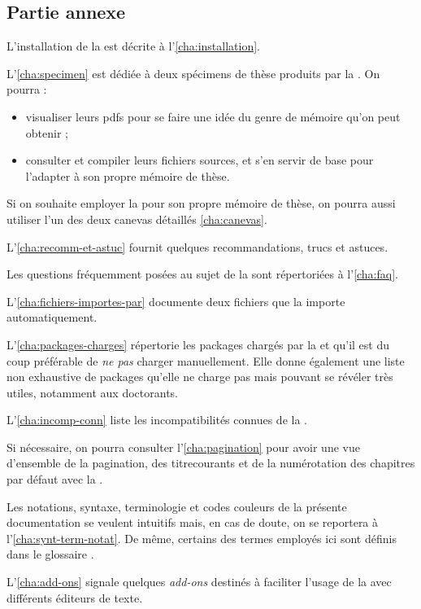 \subsection{Partie annexe}
\label{sec:partie-annexe}

L'installation de la \yatcl{} est décrite à l'\vref{cha:installation}.

L'\vref{cha:specimen} est dédiée à deux spécimens de thèse produits par la
\yatcl{}. On pourra :
\begin{itemize}
\item visualiser leurs \glspl{pdf} pour se faire une idée du genre de mémoire
  qu'on peut obtenir ;
\item consulter et compiler leurs fichiers sources, et s'en servir de base pour
  l'adapter à son propre mémoire de thèse.
\end{itemize}

Si on souhaite employer la \yatcl{} pour son propre mémoire de thèse, on pourra
aussi utiliser l'un des deux canevas détaillés \vref{cha:canevas}.

L'\vref{cha:recomm-et-astuc} fournit quelques recommandations, trucs et
astuces.

Les questions fréquemment posées au sujet de la \yatcl{} sont répertoriées
à l'\vref{cha:faq}.

L'\vref{cha:fichiers-importes-par} documente deux fichiers que la \yatcl{}
importe automatiquement.

L'\vref{cha:packages-charges} répertorie les packages chargés par la \yatcl{}
et qu'il est du coup préférable de \emph{ne pas} charger manuellement. Elle
donne également une liste non exhaustive de packages qu'elle ne charge pas mais
pouvant se révéler très utiles, notamment aux doctorants.

L'\vref{cha:incomp-conn} liste les incompatibilités connues de la \yatcl{}.

Si nécessaire, on pourra consulter l'\vref{cha:pagination} pour avoir une vue
d'ensemble de la \gls{pagination}, des \glspl{titrecourant} et de la
numérotation des chapitres par défaut avec la \yatcl{}.

Les notations, syntaxe, terminologie et codes couleurs de la présente
documentation se veulent intuitifs mais, en cas de doute, on se reportera
à l'\vref{cha:synt-term-notat}. De même, certains des termes employés ici sont
définis dans le glossaire .

L'\vref{cha:add-ons} signale quelques \emph{add-ons} destinés à faciliter
l'usage de la \yatcl{} avec différents éditeurs de texte.

